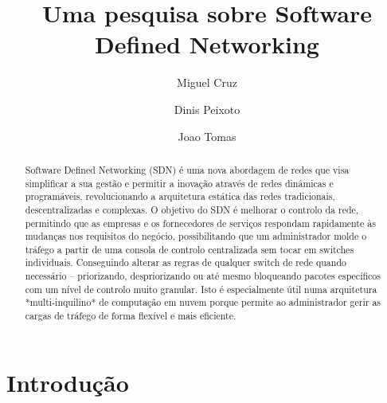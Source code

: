\documentclass{llncs}
\begin{document}
\mainmatter
\title{Uma pesquisa sobre Software Defined Networking}


\author{Miguel Cruz \and Dinis Peixoto \and Joao Tomas}



\date{}


\maketitle
\begin{abstract}
    Software Defined Networking (SDN) é uma nova abordagem de redes que visa simplificar a sua gestão e permitir a inovação através de redes dinâmicas e programáveis,  revolucionando a arquitetura estática das redes tradicionais, descentralizadas e complexas. 
    O objetivo do SDN é melhorar o controlo da rede, permitindo que as empresas e os fornecedores de serviços respondam rapidamente às mudanças nos requisitos do negócio, possibilitando que um administrador molde o tráfego a partir de uma consola de controlo centralizada sem tocar em switches individuais. Conseguindo alterar as regras de qualquer switch de rede quando necessário – priorizando, despriorizando ou até mesmo bloqueando pacotes específicos com um nível de controlo muito granular.
    Isto é especialmente útil numa arquitetura *multi-inquilino* de computação em nuvem porque permite ao administrador gerir as cargas de tráfego de forma flexível e mais eficiente.
\end{abstract}

\section{Introdução}
\end{document}
